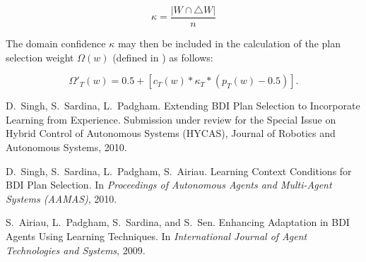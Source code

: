 \documentclass[a4paper]{article}
\begin{document}
\begin{equation}
\kappa = \frac{| W \cap \triangle W |}{n}
\label{eqn:domain_confidence}
\end{equation}


The domain confidence $\kappa$ may then be included in the calculation of the plan selection weight $\Omega(w)$ (defined in \cite{Singh:AAMAS10}) as follows:


\begin{equation}
\Omega'_T(w) = 0.5 + \left[  c_T(w) *  \kappa_T * \left( p_T(w) - 0.5 \right)  \right].
\end{equation}


\begin{thebibliography}{10}

D.~Singh, S.~Sardina, L.~Padgham.
\newblock Extending BDI Plan Selection to Incorporate Learning from Experience.
\newblock Submission under review for the Special Issue on Hybrid Control of Autonomous Systems (HYCAS), Journal of Robotics and Autonomous Systems, 2010.

D.~Singh, S.~Sardina, L.~Padgham, S.~Airiau.
\newblock Learning Context Conditions for {BDI} Plan Selection.
\newblock In {\em Proceedings of Autonomous Agents and Multi-Agent Systems (AAMAS)}, 2010.

S.~Airiau, L.~Padgham, S.~Sardina, and S.~Sen.
\newblock Enhancing Adaptation in {BDI} Agents Using Learning Techniques.
\newblock In {\em International Journal of Agent Technologies and Systems},
2009.

\end{thebibliography}
\end{document}
